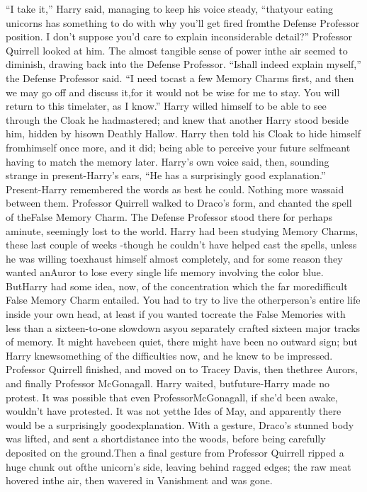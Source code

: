 ``I take it,'' Harry said, managing to keep his voice steady, ``thatyour eating unicorns has something to do with why you'll get fired fromthe Defense Professor position. I don't suppose you'd care to explain inconsiderable detail?''
Professor Quirrell looked at him. The almost tangible sense of power inthe air seemed to diminish, drawing back into the Defense Professor. ``Ishall indeed explain myself,'' the Defense Professor said. ``I need tocast a few Memory Charms first, and then we may go off and discuss it,for it would not be wise for me to stay. You will return to this timelater, as I know.''
Harry willed himself to be able to see through the Cloak he hadmastered; and knew that another Harry stood beside him, hidden by hisown Deathly Hallow. Harry then told his Cloak to hide himself fromhimself once more, and it did; being able to perceive your future selfmeant having to match the memory later.
Harry's own voice said, then, sounding strange in present-Harry's ears,
``He has a surprisingly good explanation.''
Present-Harry remembered the words as best he could. Nothing more wassaid between them.
Professor Quirrell walked to Draco's form, and chanted the spell of theFalse Memory Charm. The Defense Professor stood there for perhaps aminute, seemingly lost to the world.
Harry had been studying Memory Charms, these last couple of weeks -though he couldn't have helped cast the spells, unless he was willing toexhaust himself almost completely, and for some reason they wanted anAuror to lose every single life memory involving the color blue. ButHarry had some idea, now, of the concentration which the far moredifficult False Memory Charm entailed. You had to try to live the otherperson's entire life inside your own head, at least if you wanted tocreate the False Memories with less than a sixteen-to-one slowdown asyou separately crafted sixteen major tracks of memory. It might havebeen quiet, there might have been no outward sign; but Harry knewsomething of the difficulties now, and he knew to be impressed.
Professor Quirrell finished, and moved on to Tracey Davis, then thethree Aurors, and finally Professor McGonagall. Harry waited, butfuture-Harry made no protest. It was possible that even ProfessorMcGonagall, if she'd been awake, wouldn't have protested. It was not yetthe Ides of May, and apparently there would be a surprisingly goodexplanation.
With a gesture, Draco's stunned body was lifted, and sent a shortdistance into the woods, before being carefully deposited on the ground.Then a final gesture from Professor Quirrell ripped a huge chunk out ofthe unicorn's side, leaving behind ragged edges; the raw meat hovered inthe air, then wavered in Vanishment and was gone.

